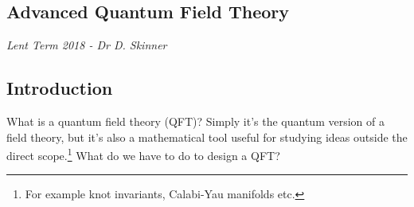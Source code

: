 \label{aqft}
\begin{chapterbox}
\vspace{-60pt}
\chapter{Advanced Quantum Field Theory}
\vspace{-30pt}
\centering\normalsize\textit{Lent Term 2018 - Dr D. Skinner}
\end{chapterbox}
\vspace{20pt}
\minitoc
\newpage
\section{Introduction}
What is a quantum field theory (QFT)? Simply it's the quantum version of a field theory, but it's also a mathematical tool useful for studying ideas outside the direct scope.\footnote{For example knot invariants, Calabi-Yau manifolds etc.} What do we have to do to design a QFT?
